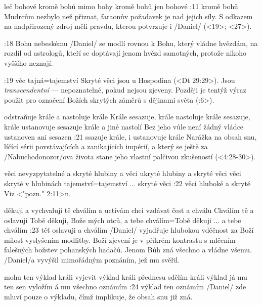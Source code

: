     {leč bohové} %
    {kromě bohů}  %
    {mimo bohy} %
    {kromě bohů}  %
    {jen bohové}  %
:11 {kromě bohů} Mudrcům nezbylo než přiznat, faraonův požadavek je nad jejich síly. S odkazem na nadpřirozený zdroj měli pravdu, kterou potvrzuje i \x/Daniel/ (<19>; <27>).



:18 {Bohu nebeskému} \x/Daniel/ se modlí rovnou k Bohu, který vládne hvězdám, na rozdíl od astrologů, kteří se doptávají jenom hvězd samotných, protože nikoho vyššího neznají.

:19 {věc tajná}={tajemství} Skryté věci jsou u Hospodina (<Dt 29:29>). Jsou {\em transcendentní} --- nepoznatelné, pokud nejsou zjeveny. Později je tentýž výraz použit pro označení Božích skrytých záměrů s dějinami světa (:6>). 

    {odstraňuje krále a nastoluje krále} %
    {Krále sesazuje, krále nastoluje}  %
    {krále sesazuje, krále ustanovuje} %
    {sesazuje krále a jiné nastolí}  %
    {Bez jeho vůle není žádný vládce ustanoven ani sesazen}  %
:21 {ssazuje krále, i ustanovuje krále} Narážka na obsah snu, líčící sérii povstávajících a zanikajících impérií, a který se ještě za \x/Nabuchodonozor/ova života stane jeho vlastní palčivou zkušeností (<4:28-30>). 

    {věci nevyzpytatelné a skryté} %
    {hlubiny a věci ukryté}  %
    {hlubiny a skryté věci} %
    {věci skryté v hlubinách}  %
    {tajemství}={tajemství ... skryté věci}  %
:22 {věci hluboké a skryté} Viz <"pozn." 2:11>n. 

    {děkuji a vychvaluji tě} %
    {chválím a uctívám}  %
    {chci vzdávat čest a chválu} %
    {Chválím tě a oslavuji}  %
    {Tobě děkuji, Bože mých otců, a tebe chválím}={Tobě děkuji ... a tebe chválím}  %
:23 {těť oslavuji a chválím} \x/Daniel/ vyjadřuje hlubokou vděčnost za Boží milost vyslyšením modlitby. Boží zjevení je v příkrém kontrastu s mlčením falešných božstev pohanských hadačů. Jenom Bůh zná všechno a vládne všemu. \x/Daniel/a vyvýšil mimořádným poznáním, jež mu svěřil.

    {mohu ten výklad králi vyjevit}  %
    {výklad králi přednesu}  %
    {sdělím králi výklad} %
    {já mu ten sen vyložím}  %
    {á mu všechno oznámím}  %
:24 {výklad ten oznámím} \x/Daniel/ zde mluví pouze o výkladu, čímž implikuje, že obsah snu  již zná.


